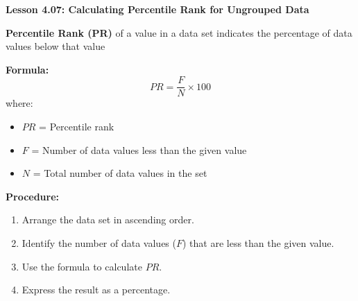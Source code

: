 \begin{center}
\textbf{Lesson 4.07: Calculating Percentile Rank for Ungrouped Data}
\end{center}

\vspace*{-1.5ex}

\noindent\textbf{Percentile Rank (PR)} of a value in a data set indicates the percentage of data values below that value

\noindent\textbf{Formula:}  
\[
PR = \dfrac{F}{N} \times 100
\]
where:  
\begin{itemize}
    \item \(PR\) = Percentile rank
    \item \(F\) = Number of data values less than the given value
    \item \(N\) = Total number of data values in the set 
\end{itemize}

\noindent\textbf{Procedure:}  
\begin{enumerate}
    \item Arrange the data set in ascending order.  
    \item Identify the number of data values (\(F\)) that are less than the given value.  
    \item Use the formula to calculate \(PR\).  
    \item Express the result as a percentage.  
\end{enumerate}

